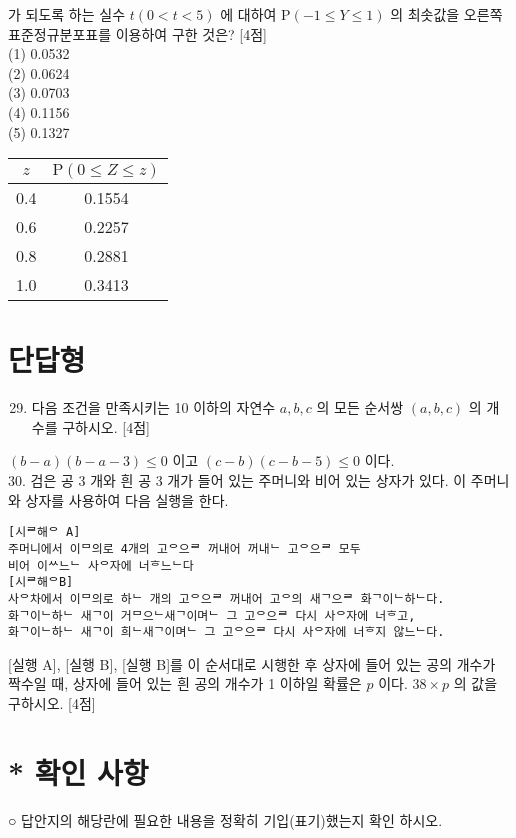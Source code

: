 \documentclass[10pt]{article}
\begin{document}
가 되도록 하는 실수 \(t(0<t<5)\) 에 대하여 \(\mathrm{P}(-1 \leq Y \leq 1)\) 의 최솟값을 오른쪽 표준정규분포표를 이용하여 구한 것은? [4점]\\
(1) 0.0532\\
(2) 0.0624\\
(3) 0.0703\\
(4) 0.1156\\
(5) 0.1327

\begin{center}
\begin{tabular}{|c|c|}
\hline
\(z\) & \(\mathrm{P}(0 \leq Z \leq z)\) \\
\hline
0.4 & 0.1554 \\
\hline
0.6 & 0.2257 \\
\hline
0.8 & 0.2881 \\
\hline
1.0 & 0.3413 \\
\hline
\end{tabular}
\end{center}

\section*{단답형}
\begin{enumerate}
  \setcounter{enumi}{28}
  \item 다음 조건을 만족시키는 10 이하의 자연수 \(a, b, c\) 의 모든 순서쌍 \((a, b, c)\) 의 개수를 구하시오. [4점]
\end{enumerate}

\((b-a)(b-a-3) \leq 0\) 이고 \((c-b)(c-b-5) \leq 0\) 이다.\\
30. 검은 공 3 개와 흰 공 3 개가 들어 있는 주머니와 비어 있는 상자가 있다. 이 주머니와 상자를 사용하여 다음 실행을 한다.

\begin{verbatim}
[시ᄅ해ᄋ A]
주머니에서 이ᄆ의로 4개의 고ᄋ으ᄅ 꺼내어 꺼내ᄂ 고ᄋ으ᄅ 모두
비어 이ᄊ느ᄂ 사ᄋ자에 너ᄒ느ᄂ다
[시ᄅ해ᄋB]
사ᄋ차에서 이ᄆ의로 하ᄂ 개의 고ᄋ으ᄅ 꺼내어 고ᄋ의 새ᄀ으ᄅ 화ᄀ이ᄂ하ᄂ다.
화ᄀ이ᄂ하ᄂ 새ᄀ이 거ᄆ으ᄂ새ᄀ이며ᄂ 그 고ᄋ으ᄅ 다시 사ᄋ자에 너ᄒ고,
화ᄀ이ᄂ하ᄂ 새ᄀ이 희ᄂ새ᄀ이며ᄂ 그 고ᄋ으ᄅ 다시 사ᄋ자에 너ᄒ지 않느ᄂ다.
\end{verbatim}

[실행 A], [실행 B], [실행 B]를 이 순서대로 시행한 후 상자에 들어 있는 공의 개수가 짝수일 때, 상자에 들어 있는 흰 공의 개수가 1 이하일 확률은 \(p\) 이다. \(38 \times p\) 의 값을 구하시오. [4점]

\section*{* 확인 사항}
○ 답안지의 해당란에 필요한 내용을 정확히 기입(표기)했는지 확인 하시오.
\end{document}
